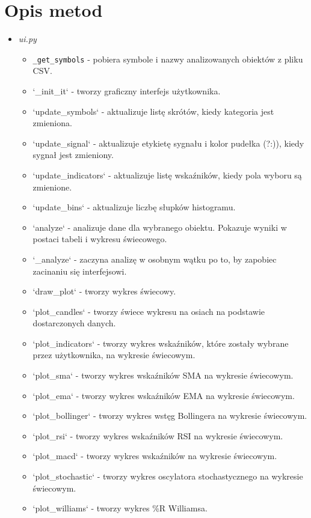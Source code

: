 \documentclass[12pt]{article}
\begin{document}
	\section{Opis metod}\label{sec:uzyte-metody}
	\begin{itemize}
	\item \textit{ui.py}
		\begin{itemize}
			\item \lstinline{_get_symbols} - pobiera symbole i nazwy analizowanych obiektów z pliku CSV.
			\item `\_init\_it` - tworzy graficzny interfejs użytkownika.
			\item `update\_symbols` - aktualizuje listę skrótów, kiedy kategoria jest zmieniona.
			\item `update\_signal` - aktualizuje etykietę sygnału i kolor pudełka (?:)), kiedy sygnał jest zmieniony.
			\item `update\_indicators` - aktualizuje listę wskaźników, kiedy pola wyboru są zmienione.
			\item `update\_bins` - aktualizuje liczbę słupków histogramu.
			\item `analyze` - analizuje dane dla wybranego obiektu.
			Pokazuje wyniki w postaci tabeli i wykresu świecowego.
			\item `\_analyze` - zaczyna analizę w osobnym wątku po to, by zapobiec zacinaniu się interfejsowi.
			\item `draw\_plot` - tworzy wykres świecowy.
			\item `plot\_candles` - tworzy świece wykresu na osiach na podstawie dostarczonych danych.
			\item `plot\_indicators` - tworzy wykres wskaźników, które zostały wybrane przez użytkownika, na wykresie
			świecowym.
			\item `plot\_sma` - tworzy wykres wskaźników SMA na wykresie świecowym.
			\item `plot\_ema` - tworzy wykres wskaźników EMA na wykresie świecowym.
			\item `plot\_bollinger` - tworzy wykres wstęg Bollingera na wykresie świecowym.
			\item `plot\_rsi` - tworzy wykres wskaźników RSI na wykresie świecowym.
			\item `plot\_macd` - tworzy wykres wskaźników na wykresie świecowym.
			\item `plot\_stochastic` - tworzy wykres oscylatora stochastycznego na wykresie świecowym.
			\item `plot\_williams` - tworzy wykres \%R Williamsa.

\end{itemize}
\end{itemize}
\end{document}
